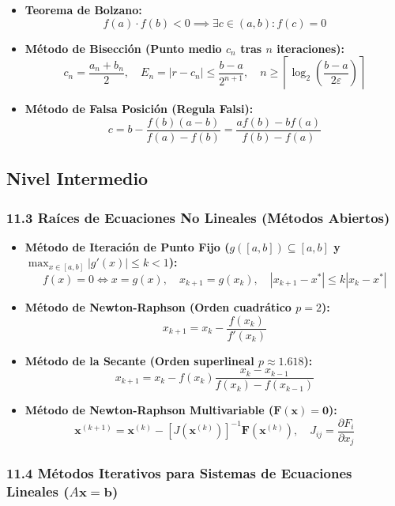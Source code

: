 \documentclass[11pt,a4paper]{article}
\begin{document}
\begin{itemize}
  \item \textbf{Teorema de Bolzano:}
  \[
    f(a) \cdot f(b) < 0 \implies \exists c \in (a, b) : f(c) = 0
  \]
  \item \textbf{Método de Bisección (Punto medio $c_n$ tras $n$ iteraciones):}
  \[
    c_n = \frac{a_n + b_n}{2}, \quad E_n = |r - c_n| \le \frac{b - a}{2^{n+1}}, \quad n \ge \left\lceil \log_2\left(\frac{b - a}{2\varepsilon}\right) \right\rceil
  \]
  \item \textbf{Método de Falsa Posición (Regula Falsi):}
  \[
    c = b - \frac{f(b)(a - b)}{f(a) - f(b)} = \frac{a f(b) - b f(a)}{f(b) - f(a)}
  \]
\end{itemize}

\subsection*{Nivel Intermedio}

\subsubsection*{11.3 Raíces de Ecuaciones No Lineales (Métodos Abiertos)}

\begin{itemize}
  \item \textbf{Método de Iteración de Punto Fijo ($g([a, b]) \subseteq [a, b]$ y $\max_{x \in [a, b]} |g'(x)| \le k < 1$):}
  \[
    f(x) = 0 \iff x = g(x), \quad x_{k+1} = g(x_k), \quad |x_{k+1} - x^*| \le k |x_k - x^*|
  \]
  \item \textbf{Método de Newton-Raphson (Orden cuadrático $p = 2$):}
  \[
    x_{k+1} = x_k - \frac{f(x_k)}{f'(x_k)}
  \]
  \item \textbf{Método de la Secante (Orden superlineal $p \approx 1.618$):}
  \[
    x_{k+1} = x_k - f(x_k)\frac{x_k - x_{k-1}}{f(x_k) - f(x_{k-1})}
  \]
  \item \textbf{Método de Newton-Raphson Multivariable ($\mathbf{F}(\mathbf{x}) = \mathbf{0}$):}
  \[
    \mathbf{x}^{(k+1)} = \mathbf{x}^{(k)} - [J(\mathbf{x}^{(k)})]^{-1}\mathbf{F}(\mathbf{x}^{(k)}), \quad J_{ij} = \frac{\partial F_i}{\partial x_j}
  \]
\end{itemize}

\subsubsection*{11.4 Métodos Iterativos para Sistemas de Ecuaciones Lineales ($A\mathbf{x} = \mathbf{b}$)}
\end{document}
